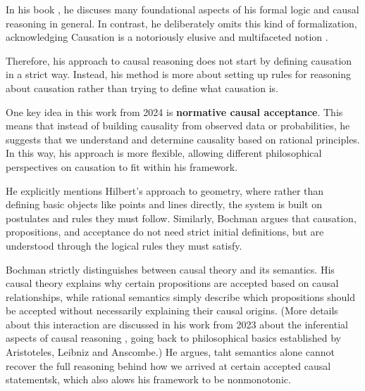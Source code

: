 \documentclass[seminar,palatino,english]{AIGpaper}
\begin{document}
In his book \cite{bochman_logical_2021}, he discuses many foundational aspects of his formal logic and causal reasoning in general. In contrast, he deliberately omits this kind of formalization, acknowledging \glqq{}Causation is a notoriously elusive and multifaceted notion\grqq{} \cite{bochman_causal_2024}.

Therefore, his approach to causal reasoning does not start by defining causation in a strict way. Instead, his method is more about setting up rules for reasoning about causation rather than trying to define what causation is.

One key idea in this work from 2024 is \textbf{normative causal acceptance}. This means that instead of building causality from observed data or probabilities, he suggests that we understand and determine causality based on rational principles. In this way, his approach is more flexible, allowing different philosophical perspectives on causation to fit within his framework.

He explicitly mentions Hilbert’s approach to geometry, where rather than defining basic objects like points and lines directly, the system is built on postulates and rules they must follow. Similarly, Bochman argues that causation, propositions, and acceptance do not need strict initial definitions, but are understood through the logical rules they must satisfy.

Bochman strictly distinguishes between causal theory and its semantics. His causal theory explains why certain propositions are accepted based on causal relationships, while rational semantics simply describe which propositions should be accepted without necessarily explaining their causal origins. (More details about this interaction are discussed in his work from 2023 about the inferential aspects of causal reasoning \cite{bochman_inferential_2023}, going back to philosophical basics established by Aristoteles, Leibniz and Anscombe.) He argues, taht semantics alone cannot recover the full reasoning behind how we arrived at certain accepted causal statementsk, which also alows his framework to be nonmonotonic. 
\end{document}
